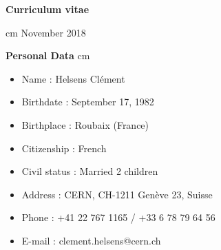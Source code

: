 \documentclass[12pt]{article}
\begin{document}
\pagestyle{fancy}
\fancyhf{}







\begin{center}
\vskip 1cm
{\bf Curriculum vitae} \\
\end{center}
 cm November 2018
\vskip 1.8cm



{\bf \large Personal Data}
 cm
\TabPositions{2.5cm}
\begin{itemize}
\itemsep0em
\item[] Name \tab : Helsens Cl\'ement
\item[] Birthdate  \tab : September 17, 1982
\item[] Birthplace \tab :   Roubaix (France) 
\item[] Citizenship \tab :  French
\item[] Civil status \tab : Married 2 children
\item[] Address \tab : CERN, CH-1211 Gen\`eve 23, Suisse
\item[] Phone \tab : +41 22 767 1165  / +33 6 78 79 64 56
\item[] E-mail \tab : clement.helsens@cern.ch
\end{itemize}


\end{document}
